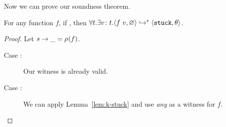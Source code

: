 %
Now we can prove our soundness theorem.
%
\begin{thm}
\label{thm:soundness}
  For any function $f$, if ,
  then $\forall t. \exists {v} \colon {t}. \langle f \ v, \varnothing \rangle \hookrightarrow^{*} \langle \mathtt{stuck}, \theta \rangle$.
\end{thm}
\begin{proof}
  Let ${s} \rightarrow \_ = \rho_{}(f)$.
  \begin{description}
  \item[Case :] Our witness is already valid.
  \item[Case :] We can apply Lemma~\ref{lem:k-stuck} and
    use \emph{any}  as a witness for $f$.
  \end{description}
\end{proof}



